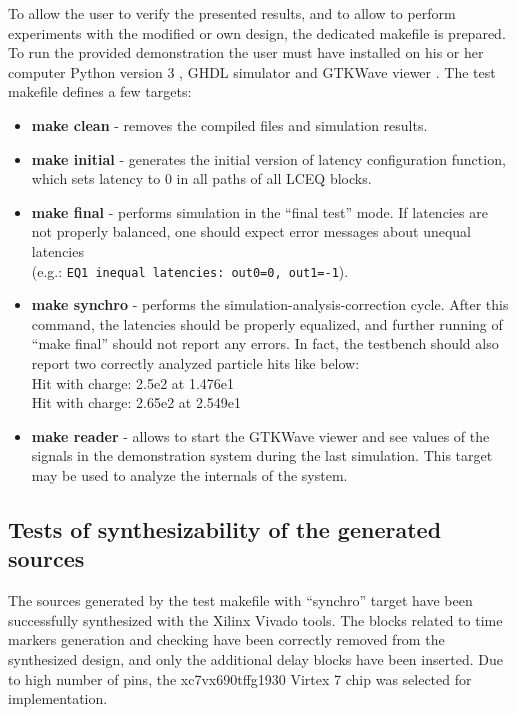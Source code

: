 \documentclass[preprint,11pt]{elsarticle}
\newcommand{\wzcite}[1]{ \cite{#1}}
\begin{document}
To allow the user to verify the presented results, and to allow to perform experiments with
the modified or own design, the dedicated makefile is prepared.
To run the provided demonstration the user must have installed on his or her computer
Python version 3\wzcite{url-python}, GHDL simulator\wzcite{url-ghdl} and GTKWave viewer\wzcite{url-gtkwave}.
The test makefile defines a few targets:
\begin{itemize}
\item {\bf make clean} - removes the compiled files and simulation results.
\item {\bf make initial} - generates the initial version of latency configuration
function, which sets latency to 0 in all paths of all LCEQ blocks.
\item {\bf make final} - performs simulation in the ``final test'' mode. If latencies are not properly balanced, one should expect error messages about unequal latencies\\
(e.g.: \verb|EQ1 inequal latencies: out0=0, out1=-1|).
\item {\bf make synchro} - performs the simulation-analysis-correction cycle. After this command, the latencies should be properly equalized, and further running of ``make final'' should not report any errors. In fact, the testbench should also report
two correctly analyzed particle hits like below:\\
Hit with charge: 2.5e2 at 1.476e1 \\
Hit with charge: 2.65e2 at 2.549e1
\item {\bf make reader} - allows to start the GTKWave viewer and see values of the signals
in the demonstration system during the last simulation. This target may be used to analyze the internals of the system.
\end{itemize}

\subsection{Tests of synthesizability of the generated sources}
The sources generated by the test makefile with ``synchro'' target have been successfully synthesized with the Xilinx Vivado\cite{url-xlx-vivado} tools. The blocks related to time markers generation and checking have been
correctly removed from the synthesized design, and only the additional delay blocks have been inserted.
Due to high number of pins, the xc7vx690tffg1930 Virtex 7 chip was selected for implementation.
	
\end{document}
